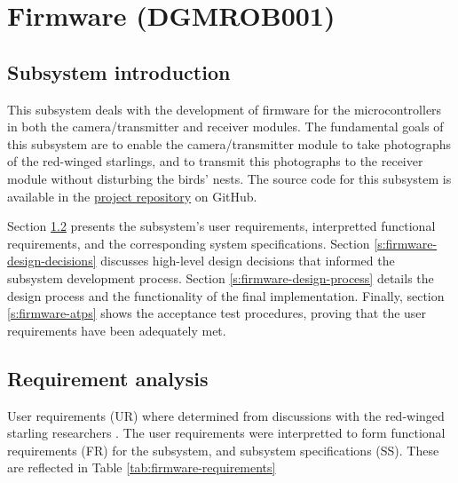 \documentclass[class=report,11pt,crop=false]{standalone}
\begin{document}
\ifstandalone
\tableofcontents
\fi
\chapter{Firmware (DGMROB001) \label{ch:firmware}}
\section{Subsystem introduction}

This subsystem deals with the development of firmware for the microcontrollers in both the camera/transmitter and receiver modules. The fundamental goals of this subsystem are to enable the camera/transmitter module to take photographs of the red-winged starlings, and to transmit this photographs to the receiver module without disturbing the birds' nests. The source code for this subsystem is available in the \href{https://github.com/rothdu/EEE4113F-Group13-2024}{project repository} on GitHub.

Section \ref{s:firmware-requirements} presents the subsystem's user requirements, interpretted functional requirements, and the corresponding system specifications. Section \ref{s:firmware-design-decisions} discusses high-level design decisions that informed the subsystem development process. Section \ref{s:firmware-design-process} details the design process and the functionality of the final implementation. Finally, section \ref{s:firmware-atps} shows the acceptance test procedures, proving that the user requirements have been adequately met.

\section{Requirement analysis} \label{s:firmware-requirements}
User requirements (UR) where determined from discussions with the red-winged starling researchers \cite{hofmeyer2024private}. The user requirements were interpretted to form functional requirements (FR) for the subsystem, and subsystem specifications (SS). These are reflected in Table \ref{tab:firmware-requirements}
\end{document}
